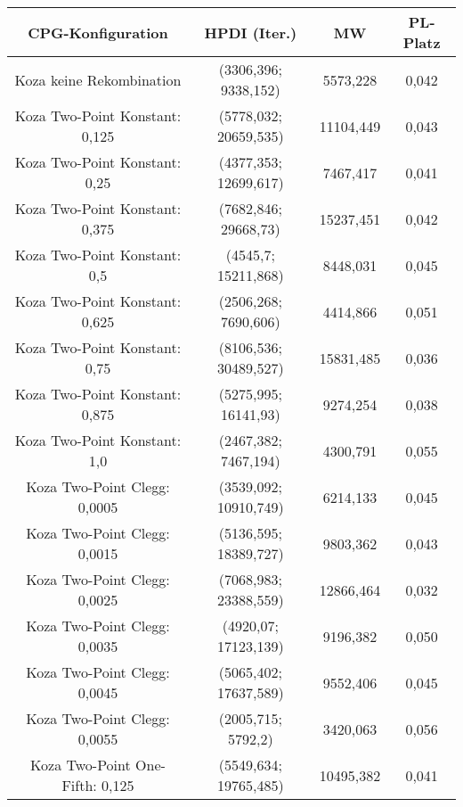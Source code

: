  \begin{table}[H]
	\centering
	\begin{tabular}{c | c | c | c}
		\textbf{CPG-Konfiguration} & \textbf{HPDI (Iter.)} & \textbf{MW} & \textbf{PL-Platz}\\
		\hline
		Koza keine Rekombination & (3306,396; 9338,152) & 5573,228 & 0,042\\
		\hline
		\hline
		Koza Two-Point Konstant: 0,125 & (5778,032; 20659,535) & 11104,449 & 0,043\\
		\hline
		Koza Two-Point Konstant: 0,25 & (4377,353; 12699,617) & 7467,417 & 0,041\\
		\hline
		Koza Two-Point Konstant: 0,375 & (\color{red}7682,846\color{black}; \color{red}29668,73\color{black}) & \color{red}15237,451\color{black} & 0,042\\
		\hline
		Koza Two-Point Konstant: 0,5 & (4545,7; 15211,868) & 8448,031 & 0,045\\
		\hline
		Koza Two-Point Konstant: 0,625 & (2506,268; 7690,606) & 4414,866 & 0,051\\
		\hline
		Koza Two-Point Konstant: 0,75 & (\color{red}8106,536\color{black}; \color{red}30489,527\color{black}) & \color{red}15831,485\color{black} & 0,036\\
		\hline
		Koza Two-Point Konstant: 0,875 & (5275,995; 16141,93) & 9274,254 & 0,038\\
		\hline
		Koza Two-Point Konstant: 1,0 & (\color{Green}2467,382\color{black}; 7467,194) & \color{Green}4300,791\color{black} & \color{Green}0,055\color{black}\\
		\hline
		\hline
		Koza Two-Point Clegg: 0,0005 & (3539,092; 10910,749) & 6214,133 & 0,045\\
		\hline
		Koza Two-Point Clegg: 0,0015 & (5136,595; 18389,727) & 9803,362 & 0,043\\
		\hline
		Koza Two-Point Clegg: 0,0025 & (7068,983; 23388,559) & 12866,464 & \color{red}0,032\color{black}\\
		\hline
		Koza Two-Point Clegg: 0,0035 & (4920,07; 17123,139) & 9196,382 & 0,050\\
		\hline
		Koza Two-Point Clegg: 0,0045 & (5065,402; 17637,589) & 9552,406 & 0,045\\
		\hline
		Koza Two-Point Clegg: 0,0055 & (\color{Green}2005,715\color{black}; \color{Green}5792,2\color{black}) & \color{Green}3420,063\color{black} & \color{Green}0,056\color{black}\\
		\hline
		\hline
		Koza Two-Point One-Fifth: 0,125 & (5549,634; 19765,485) & 10495,382 & 0,041\\

\end{tabular}
\end{table}
